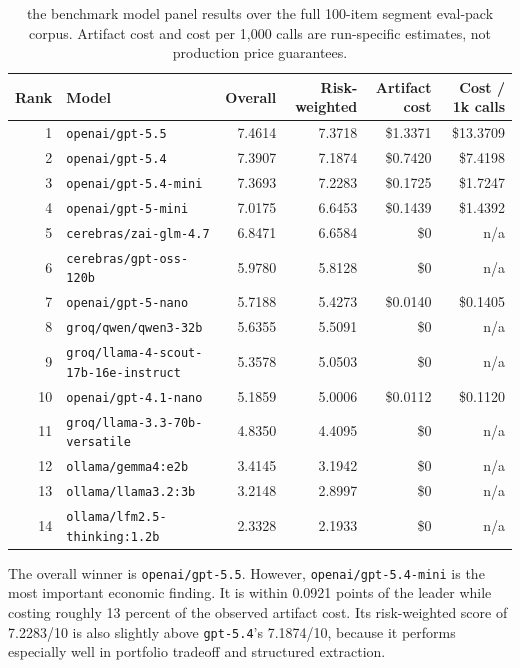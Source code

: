 \documentclass[11pt]{article}
\newcommand{\score}[1]{#1/10}
\newcommand{\code}[1]{\texttt{#1}}
\begin{document}
\begin{table}[t]
\centering
\small
\begin{tabularx}{\textwidth}{r X r r r r}
\toprule
Rank & Model & Overall & Risk-weighted & Artifact cost & Cost / 1k calls \\
\midrule
1 & \code{openai/gpt-5.5} & 7.4614 & 7.3718 & \$1.3371 & \$13.3709 \\
2 & \code{openai/gpt-5.4} & 7.3907 & 7.1874 & \$0.7420 & \$7.4198 \\
3 & \code{openai/gpt-5.4-mini} & 7.3693 & 7.2283 & \$0.1725 & \$1.7247 \\
4 & \code{openai/gpt-5-mini} & 7.0175 & 6.6453 & \$0.1439 & \$1.4392 \\
5 & \code{cerebras/zai-glm-4.7} & 6.8471 & 6.6584 & \$0 & n/a \\
6 & \code{cerebras/gpt-oss-120b} & 5.9780 & 5.8128 & \$0 & n/a \\
7 & \code{openai/gpt-5-nano} & 5.7188 & 5.4273 & \$0.0140 & \$0.1405 \\
8 & \code{groq/qwen/qwen3-32b} & 5.6355 & 5.5091 & \$0 & n/a \\
9 & \code{groq/llama-4-scout-17b-16e-instruct} & 5.3578 & 5.0503 & \$0 & n/a \\
10 & \code{openai/gpt-4.1-nano} & 5.1859 & 5.0006 & \$0.0112 & \$0.1120 \\
11 & \code{groq/llama-3.3-70b-versatile} & 4.8350 & 4.4095 & \$0 & n/a \\
12 & \code{ollama/gemma4:e2b} & 3.4145 & 3.1942 & \$0 & n/a \\
13 & \code{ollama/llama3.2:3b} & 3.2148 & 2.8997 & \$0 & n/a \\
14 & \code{ollama/lfm2.5-thinking:1.2b} & 2.3328 & 2.1933 & \$0 & n/a \\
\bottomrule
\end{tabularx}
\caption{the benchmark model panel results over the full 100-item segment eval-pack corpus. Artifact cost and cost per 1,000 calls are run-specific estimates, not production price guarantees.}
\label{tab:leaderboard}
\end{table}

The overall winner is \code{openai/gpt-5.5}. However, \code{openai/gpt-5.4-mini} is the most important economic finding. It is within 0.0921 points of the leader while costing roughly 13 percent of the observed artifact cost. Its risk-weighted score of \score{7.2283} is also slightly above \code{gpt-5.4}'s \score{7.1874}, because it performs especially well in portfolio tradeoff and structured extraction.
\end{document}

